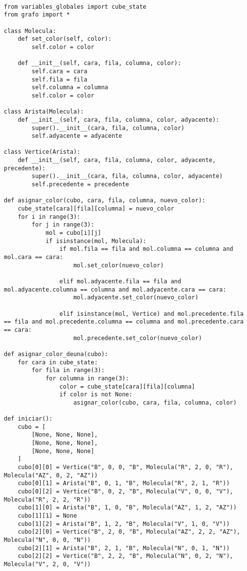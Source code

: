 \begin{lstlisting}

from variables_globales import cube_state
from grafo import *

class Molecula:
    def set_color(self, color):
        self.color = color
                
    def __init__(self, cara, fila, columna, color):
        self.cara = cara
        self.fila = fila
        self.columna = columna
        self.color = color

class Arista(Molecula):
    def __init__(self, cara, fila, columna, color, adyacente):
        super().__init__(cara, fila, columna, color)
        self.adyacente = adyacente

class Vertice(Arista):
    def __init__(self, cara, fila, columna, color, adyacente, precedente):
        super().__init__(cara, fila, columna, color, adyacente)
        self.precedente = precedente

def asignar_color(cubo, cara, fila, columna, nuevo_color):
    cube_state[cara][fila][columna] = nuevo_color 
    for i in range(3):
        for j in range(3):
            mol = cubo[i][j]
            if isinstance(mol, Molecula):
                if mol.fila == fila and mol.columna == columna and mol.cara == cara:
                    mol.set_color(nuevo_color)
                
                elif mol.adyacente.fila == fila and mol.adyacente.columna == columna and mol.adyacente.cara == cara:
                    mol.adyacente.set_color(nuevo_color)
                    
                elif isinstance(mol, Vertice) and mol.precedente.fila == fila and mol.precedente.columna == columna and mol.precedente.cara == cara:
                    mol.precedente.set_color(nuevo_color)
    
def asignar_color_deuna(cubo):
    for cara in cube_state:
        for fila in range(3):
            for columna in range(3):
                color = cube_state[cara][fila][columna]
                if color is not None:
                    asignar_color(cubo, cara, fila, columna, color)
    
def iniciar():
    cubo = [
        [None, None, None],
        [None, None, None],
        [None, None, None]
    ]
    cubo[0][0] = Vertice("B", 0, 0, "B", Molecula("R", 2, 0, "R"), Molecula("AZ", 0, 2, "AZ"))
    cubo[0][1] = Arista("B", 0, 1, "B", Molecula("R", 2, 1, "R"))
    cubo[0][2] = Vertice("B", 0, 2, "B", Molecula("V", 0, 0, "V"), Molecula("R", 2, 2, "R"))
    cubo[1][0] = Arista("B", 1, 0, "B", Molecula("AZ", 1, 2, "AZ"))
    cubo[1][1] = None
    cubo[1][2] = Arista("B", 1, 2, "B", Molecula("V", 1, 0, "V"))
    cubo[2][0] = Vertice("B", 2, 0, "B", Molecula("AZ", 2, 2, "AZ"), Molecula("N", 0, 0, "N"))
    cubo[2][1] = Arista("B", 2, 1, "B", Molecula("N", 0, 1, "N"))
    cubo[2][2] = Vertice("B", 2, 2, "B", Molecula("N", 0, 2, "N"), Molecula("V", 2, 0, "V"))
    

\end{lstlisting}

